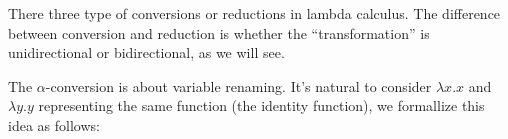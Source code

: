 \documentclass[../../../include/open-logic-section]{subfiles}
\begin{document}

There three type of conversions or reductions in lambda calculus. The
difference between conversion and reduction is whether the
``transformation'' is unidirectional or bidirectional, as we will see.

The $\alpha$-conversion is about variable renaming. It's natural to
consider $\lambda x. x$ and $\lambda y.y$ representing the same
function (the identity function), we formallize this idea as follows:
\end{document}
